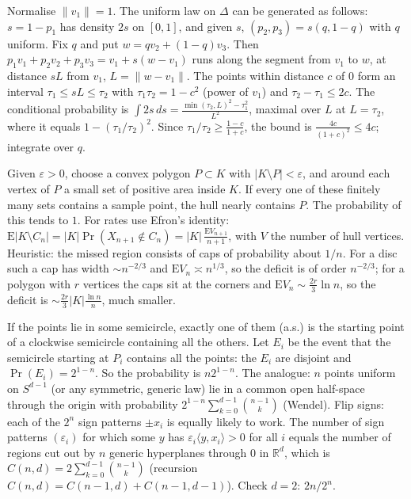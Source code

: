 \documentclass[11pt,a4paper]{article}
\begin{document}
 Normalise $\|v_1\|=1$. The uniform law on $\Delta$ can be generated as follows: $s=1-p_1$ has density $2s$ on $[0,1]$, and given $s$, $(p_2,p_3)=s(q,1-q)$ with $q$ uniform. Fix $q$ and put $w=qv_2+(1-q)v_3$.
 Then $p_1v_1+p_2v_2+p_3v_3=v_1+s(w-v_1)$ runs along the segment from $v_1$ to $w$, at distance $sL$ from $v_1$, $L=\|w-v_1\|$. The points within distance $c$ of $0$ form an interval $\tau_1\le sL\le\tau_2$ with $\tau_1\tau_2=1-c^2$ (power of $v_1$) and $\tau_2-\tau_1\le2c$.
 The conditional probability is $\int2s\,ds=\frac{\min(\tau_2,L)^2-\tau_1^2}{L^2}$, maximal over $L$ at $L=\tau_2$, where it equals $1-(\tau_1/\tau_2)^2$. Since $\tau_1/\tau_2\ge\frac{1-c}{1+c}$, the bound is $\frac{4c}{(1+c)^2}\le4c$; integrate over $q$.

 Given $\varepsilon>0$, choose a convex polygon $P\subset K$ with $|K\setminus P|<\varepsilon$, and around each vertex of $P$ a small set of positive area inside $K$. If every one of these finitely many sets contains a sample point, the hull nearly contains $P$. The probability of this tends to $1$.
 For rates use Efron's identity: $\mathrm E|K\setminus C_n|=|K|\Pr(X_{n+1}\notin C_n)=|K|\,\frac{\mathrm E V_{n+1}}{n+1}$, with $V$ the number of hull vertices.
 Heuristic: the missed region consists of caps of probability about $1/n$. For a disc such a cap has width $\sim n^{-2/3}$ and $\mathrm E V_n\asymp n^{1/3}$, so the deficit is of order $n^{-2/3}$; for a polygon with $r$ vertices the caps sit at the corners and $\mathrm E V_n\sim\frac{2r}3\ln n$, so the deficit is $\sim\frac{2r}3|K|\frac{\ln n}n$, much smaller.

 If the points lie in some semicircle, exactly one of them (a.s.) is the starting point of a clockwise semicircle containing all the others. Let $E_i$ be the event that the semicircle starting at $P_i$ contains all the points: the $E_i$ are disjoint and $\Pr(E_i)=2^{1-n}$. So the probability is $n2^{1-n}$.
 The analogue: $n$ points uniform on $S^{d-1}$ (or any symmetric, generic law) lie in a common open half-space through the origin with probability $2^{1-n}\sum_{k=0}^{d-1}\binom{n-1}k$ (Wendel). Flip signs: each of the $2^n$ sign patterns $\pm x_i$ is equally likely to work.
 The number of sign patterns $(\varepsilon_i)$ for which some $y$ has $\varepsilon_i\langle y,x_i\rangle>0$ for all $i$ equals the number of regions cut out by $n$ generic hyperplanes through $0$ in $\mathbb R^d$, which is $C(n,d)=2\sum_{k=0}^{d-1}\binom{n-1}k$ (recursion $C(n,d)=C(n-1,d)+C(n-1,d-1)$). Check $d=2$: $2n/2^n$.
\end{document}
